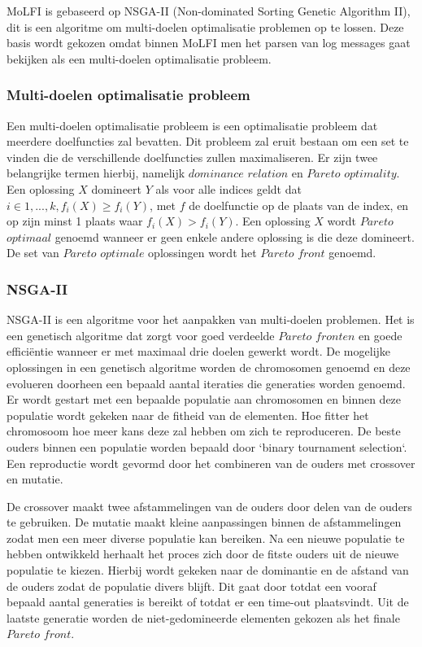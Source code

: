 MoLFI is gebaseerd op NSGA-II (Non-dominated Sorting Genetic Algorithm II), dit is een algoritme om multi-doelen optimalisatie problemen op te lossen. Deze basis wordt gekozen omdat binnen MoLFI men het parsen van log messages gaat bekijken als een multi-doelen optimalisatie probleem. 

\subsubsection{Multi-doelen optimalisatie probleem}
Een multi-doelen optimalisatie probleem is een optimalisatie probleem dat meerdere doelfuncties zal bevatten. Dit probleem zal eruit bestaan om een set te vinden die de verschillende doelfuncties zullen maximaliseren. Er zijn twee belangrijke termen hierbij, namelijk $dominance$ $relation$ en $Pareto$ $optimality$. Een oplossing $X$ domineert $Y$ als voor alle indices geldt dat \(i \in {1,...,k}, f_{i}(X) \geq f_{i}(Y)\), met $f$ de doelfunctie op de plaats van de index, en op zijn minst 1 plaats waar \(f_{i}(X) > f_{i}(Y)\). Een oplossing $X$ wordt $Pareto$ $optimaal$ genoemd wanneer er geen enkele andere oplossing is die deze domineert. De set van $Pareto$ $optimale$ oplossingen wordt het $Pareto$ $front$ genoemd.

\subsubsection{NSGA-II}
NSGA-II is een algoritme voor het aanpakken van multi-doelen problemen. Het is een genetisch algoritme dat zorgt voor goed verdeelde $Pareto$ $fronten$ en goede efficiëntie wanneer er met maximaal drie doelen gewerkt wordt. De mogelijke oplossingen in een genetisch algoritme worden de chromosomen genoemd en deze evolueren doorheen een bepaald aantal iteraties die generaties worden genoemd. Er wordt gestart met een bepaalde populatie aan chromosomen en binnen deze populatie wordt gekeken naar de fitheid van de elementen. Hoe fitter het chromosoom hoe meer kans deze zal hebben om zich te reproduceren. De beste ouders binnen een populatie worden bepaald door `binary tournament selection`. Een reproductie wordt gevormd door het combineren van de ouders met crossover en mutatie. 

De crossover maakt twee afstammelingen van de ouders door delen van de ouders te gebruiken. De mutatie maakt kleine aanpassingen binnen de afstammelingen zodat men een meer diverse populatie kan bereiken. Na een nieuwe populatie te hebben ontwikkeld herhaalt het proces zich door de fitste ouders uit de nieuwe populatie te kiezen. Hierbij wordt gekeken naar de dominantie en de afstand van de ouders zodat de populatie divers blijft. Dit gaat door totdat een vooraf bepaald aantal generaties is bereikt of totdat er een time-out plaatsvindt. Uit de laatste generatie worden de niet-gedomineerde elementen gekozen als het finale $Pareto$ $front$.

